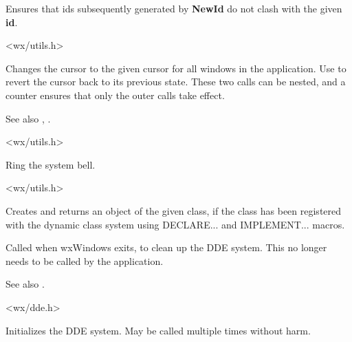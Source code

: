 
Ensures that ids subsequently generated by {\bf NewId} do not clash with
the given {\bf id}.


<wx/utils.h>

\label{wxbeginbusycursor}


Changes the cursor to the given cursor for all windows in the application.
Use  to revert the cursor back
to its previous state. These two calls can be nested, and a counter
ensures that only the outer calls take effect.

See also , .


<wx/utils.h>



Ring the system bell.


<wx/utils.h>

\label{wxcreatedynamicobject}


Creates and returns an object of the given class, if the class has been
registered with the dynamic class system using DECLARE... and IMPLEMENT... macros.

\label{wxddecleanup}


Called when wxWindows exits, to clean up the DDE system. This no longer needs to be
called by the application.

See also .


<wx/dde.h>

\label{wxddeinitialize}


Initializes the DDE system. May be called multiple times without harm.

